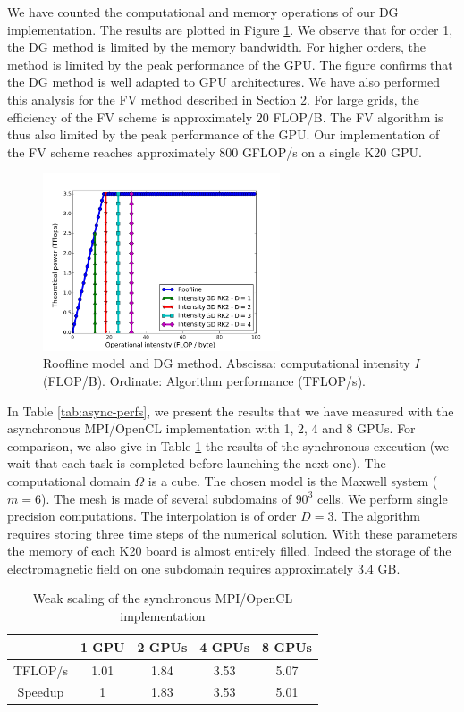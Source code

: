 \documentclass[preprint]{sig-alternate}
\begin{document}
We have counted the computational and memory operations of our DG implementation. The results are plotted in Figure \ref{fig:roofline}. We observe that for order 1, the DG method is limited by the memory bandwidth.  For higher orders, the method is limited by the peak performance of the GPU. The figure confirms that the DG method is well adapted to GPU architectures.
We have also performed this analysis for the FV method described in Section 2. For large grids, the efficiency of the FV scheme is approximately $20$ FLOP/B. The FV algorithm is thus also limited by the peak performance of the GPU. Our implementation of the FV scheme reaches approximately $800$ GFLOP/s on a single K20 GPU. 

\begin{figure}[h]
  \centering
\includegraphics[width=7cm]{roof_line_clac2}
  \caption{Roofline model and DG method. Abscissa: computational intensity $I$ (FLOP/B). Ordinate: Algorithm performance (TFLOP/s). \label{fig:roofline}}
\end{figure}

In Table \ref{tab:async-perfs}, we present the results that we have measured with the asynchronous MPI/OpenCL implementation with 1, 2, 4 and 8 GPUs. For comparison, we also give in Table \ref{tab:sync-perfs} the results of the synchronous execution (we wait that each task is completed before launching the next one). The computational domain $\Omega$ is a cube. The chosen model is the Maxwell system ($m=6$). The mesh is made of several subdomains of $90^3$ cells. We perform single precision computations. The interpolation is of order $D=3$. The algorithm requires storing three time steps of the numerical solution. With these parameters the memory of each K20 board is almost entirely filled. Indeed the storage of the electromagnetic field on one subdomain requires approximately $3.4$ GB.

\begin{table}[htdp]
\begin{center}
\begin{tabular}{|c|c|c|c|c|}
\hline
 & 1 GPU & 2 GPUs & 4 GPUs & 8 GPUs\tabularnewline
\hline
\hline
TFLOP/s & 1.01 & 1.84 & 3.53 & 5.07\tabularnewline
\hline
Speedup & 1 & 1.83 & 3.53 & 5.01\tabularnewline
\hline
\end{tabular}
\end{center}
\caption{Weak scaling of the synchronous MPI/OpenCL implementation \label{tab:sync-perfs}}
\end{table}%
\end{document}
